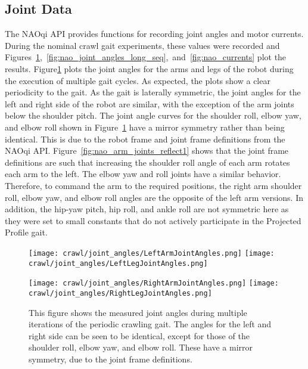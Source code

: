 \subsection{Joint Data} \label{subsec:nom_crawl_joint_data}
The NAOqi API provides functions for recording joint angles and motor currents. During the
nominal crawl gait experiments, these values were recorded and
Figures~\ref{fig:nao_joint_angles1},~\ref{fig:nao_joint_angles_long_seq},~and~\ref{fig:nao_currents} plot the results.
Figure\ref{fig:nao_joint_angles1} plots the joint angles for the arms and legs of the
robot during the execution of multiple gait cycles. As expected, the plots show a clear
periodicity to the gait.
As the gait is laterally symmetric, the joint angles for the left and right side of the robot
are similar, with the exception of the arm joints below the shoulder pitch.
The joint angle curves for the shoulder roll, elbow yaw, and elbow roll 
shown in Figure~\ref{fig:nao_joint_angles1} have a mirror symmetry rather than being identical.
This is due to the robot frame and joint frame definitions from the NAOqi API\@.
Figure~\ref{fig:nao_arm_joints_reflect1} shows that the joint frame definitions
are such that increasing the shoulder roll angle of each arm rotates each arm to the left.
The elbow yaw and roll joints have a similar behavior. Therefore, to command the arm to
the required positions, the right arm shoulder roll, elbow yaw, and elbow roll angles
are the opposite of the left arm versions.
In addition, the hip-yaw pitch, hip roll, and ankle roll are not symmetric here as they
were set to small constants that do not actively participate in the Projected Profile gait.

\begin{figure}
\centering
\texttt{[image: crawl/joint\_angles/LeftArmJointAngles.png]}
\texttt{[image: crawl/joint\_angles/LeftLegJointAngles.png]}

\centering
\texttt{[image: crawl/joint\_angles/RightArmJointAngles.png]}
\texttt{[image: crawl/joint\_angles/RightLegJointAngles.png]}

\caption{This figure shows the measured joint angles during multiple iterations of the periodic crawling gait.
         The angles for the left and right side can be seen to be identical, except for those
         of the shoulder roll, elbow yaw, and elbow roll. These have a mirror symmetry, due to
         the joint frame definitions.}
\label{fig:nao_joint_angles1}
\end{figure}

